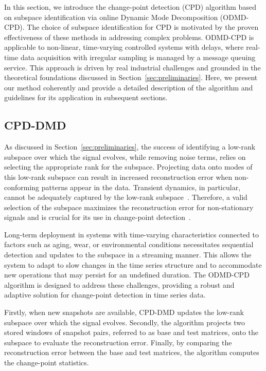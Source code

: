 In this section, we introduce the change-point detection (CPD) algorithm based on subspace identification via online Dynamic Mode Decomposition (ODMD-CPD). The choice of subspace identification for CPD is motivated by the proven effectiveness of these methods in addressing complex problems. ODMD-CPD is applicable to non-linear, time-varying controlled systems with delays, where real-time data acquisition with irregular sampling is managed by a message queuing service. This approach is driven by real industrial challenges and grounded in the theoretical foundations discussed in Section~\ref{sec:preliminaries}. Here, we present our method coherently and provide a detailed description of the algorithm and guidelines for its application in subsequent sections.

\subsection{CPD-DMD}
As discussed in Section~\ref{sec:preliminaries}, the success of identifying a low-rank subspace over which the signal evolves, while removing noise terms, relies on selecting the appropriate rank for the subspace. Projecting data onto modes of this low-rank subspace can result in increased reconstruction error when non-conforming patterns appear in the data. Transient dynamics, in particular, cannot be adequately captured by the low-rank subspace~\citep{Kuehn2011, Gottwald2020}. Therefore, a valid selection of the subspace maximizes the reconstruction error for non-stationary signals and is crucial for its use in change-point detection~\citep{Moskvina2003}.

Long-term deployment in systems with time-varying characteristics connected to factors such as aging, wear, or environmental conditions necessitates sequential detection and updates to the subspace in a streaming manner. This allows the system to adapt to slow changes in the time series structure and to accommodate new operations that may persist for an undefined duration. The ODMD-CPD algorithm is designed to address these challenges, providing a robust and adaptive solution for change-point detection in time series data.

Firstly, when new snapshots are available, CPD-DMD updates the low-rank subspace over which the signal evolves. Secondly, the algorithm projects two stored windows of snapshot pairs, referred to as base and test matrices, onto the subspace to evaluate the reconstruction error. Finally, by comparing the reconstruction error between the base and test matrices, the algorithm computes the change-point statistics.

